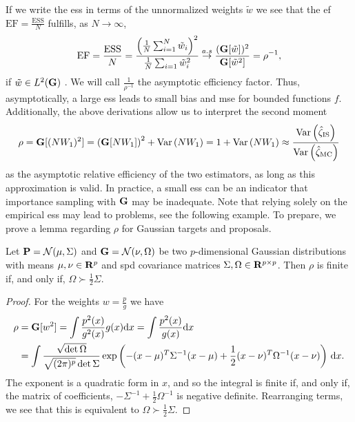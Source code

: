 If we write the \gls{ess} in terms of the unnormalized weights $\tilde w$ we see that the \gls{ef} $\text{EF} = \frac{\text{ESS}}{N}$ fulfills, as $N\to\infty$,
\begin{align}
\label{eq:efficency_factor}
\text{EF} = \frac{\text{ESS}}{N} = \frac{\left(\frac{1}{N}\sum_{i = 1}^{N} \tilde w_{i}\right)^{2}}{\frac{1}{N}\sum_{i = 1} \tilde w_{i}^2} \stackrel{a.s}{\to} \frac{(\G [\tilde w])^{2}}{\G [\tilde w^{2}]} = \rho^{-1},
\end{align}
if $\tilde w \in L^{2}(\G)$ \citep[Section 2.3.2]{Agapiou2017Importance}. We will call $\frac{1}{\rho^{-1}}$ the asymptotic efficiency factor. Thus, asymptotically, a large \gls{ess} leads to small bias and \gls{mse} for bounded functions $f$. Additionally, the above derivations allow us to interpret the second moment
$$
\rho = \G [(NW_1)^2] = \left(\G [NW_1]\right)^{2} + \var \left( NW_1 \right) = 1 + \var \left(NW_1\right) \approx \frac{\var \left(\hat\zeta_{\text{IS}}\right)}{\var \left(\hat\zeta_{\text{MC}}\right)}
$$
as the asymptotic relative efficiency of the two estimators, as long as this approximation is valid. In practice, a small \gls{ess} can be an indicator that importance sampling with $\G$ may be inadequate. Note that relying solely on the empirical \gls{ess} may lead to problems, see the following example. To prepare, we prove a lemma regarding $\rho$ for Gaussian targets and proposals.

\begin{lemma}
    \label{lem:gaussian_proposal_factor_2}
    Let $\P = \mathcal N(\mu, \Sigma)$ and $\G = \mathcal N(\nu, \Omega)$ be two $p$-dimensional Gaussian distributions with means $\mu,\nu \in \R^{p}$ and \gls{spd} covariance matrices $\Sigma,\Omega \in \R^{p\times p}$. 
    Then $\rho$ is finite if, and only if, $\Omega \succ \frac{1}{2} \Sigma$. 
\end{lemma}

\begin{proof}
    For the weights $w = \frac{p}{g}$ we have
    \begin{align*}
        \rho &= \G [w^{2}] = \int \frac{p^{2}(x)}{g^{2}(x)} g(x) \mathrm d x = \int \frac{p^{2}(x)}{g(x)} \mathrm d x \\
        &= \int \frac{\sqrt{\det \Omega}}{\sqrt{(2\pi)^{p}}\det \Sigma} \exp \left( -(x - \mu)^{T}\Sigma^{-1}(x - \mu) + \frac{1}{2}(x - \nu)^{T}\Omega^{-1}(x - \nu)\right) \d x. 
    \end{align*}
    The exponent is a quadratic form in $x$, and so the integral is finite if, and only if, the matrix of coefficients, $-\Sigma^{-1} + \frac{1}{2}\Omega^{-1}$ is negative definite. Rearranging terms, we see that this is equivalent to $\Omega \succ \frac{1}{2}\Sigma$.
\end{proof}

